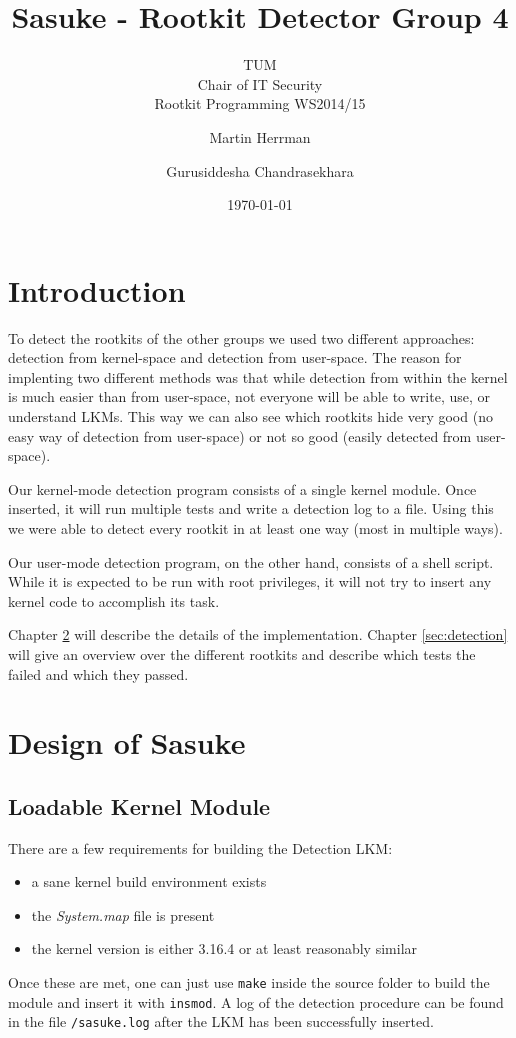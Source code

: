 \documentclass[10pt, letterpaper]{scrartcl}
\title{Sasuke - Rootkit Detector Group 4}
\subtitle{TUM \\Chair of IT Security\\  Rootkit Programming WS2014/15}
\author{Martin Herrman \and Gurusiddesha Chandrasekhara}
\date{\today}
\begin{document}
\maketitle
\tableofcontents
\newpage

\section{Introduction}
To detect the rootkits of the other groups we used two different approaches: detection from kernel-space and detection from user-space.
The reason for implenting two different methods was that while detection from within the kernel is much easier than from user-space, not everyone will be able to write, use, or understand LKMs.
This way we can also see which rootkits hide very good (no easy way of detection from user-space) or not so good (easily detected from user-space). 

Our kernel-mode detection program consists of a single kernel module.
Once inserted, it will run multiple tests and write a detection log to a file.
Using this we were able to detect every rootkit in at least one way (most in multiple ways).

Our user-mode detection program, on the other hand, consists of a shell script.
While it is expected to be run with root privileges, it will not try to insert any kernel code to accomplish its task.

Chapter \ref{sec:design} will describe the details of the implementation. Chapter \ref{sec:detection} will give an overview over the different rootkits and describe which tests the failed and which they passed.

\section{Design of Sasuke}\label{sec:design}

\subsection{Loadable Kernel Module}\label{sec:lkm}
There are a few requirements for building the Detection LKM: 
\begin{itemize}
	\item a sane kernel build environment exists
	\item the \emph{System.map} file is present
	\item the kernel version is either 3.16.4 or at least reasonably similar
\end{itemize}
Once these are met, one can just use \texttt{make} inside the source folder to build the module and insert it with \texttt{insmod}. A log of the detection procedure can be found in the file \texttt{/sasuke.log} after the LKM has been successfully inserted.
\end{document}
